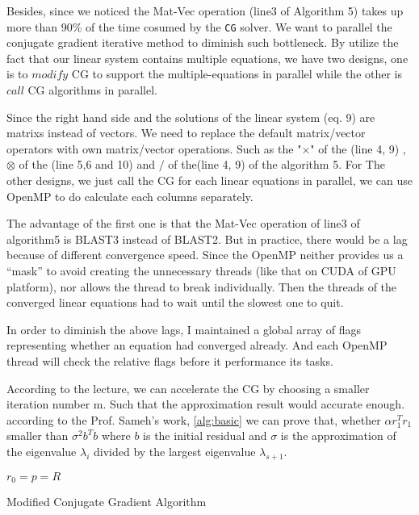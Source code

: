 Besides, since we noticed the Mat-Vec operation (line3 of Algorithm 5) takes up more than 90\% of the time cosumed by the {\tt CG} solver. We want to parallel the conjugate gradient iterative method to diminish such bottleneck.
By utilize the fact that our linear system contains multiple equations, we have two designs, one is to $modify$ CG to support the multiple-equations in parallel while the other is $call$ CG algorithms in parallel.

Since the right hand side and the solutions of the linear system (eq. 9) are matrixs instead of vectors. We need to replace the default matrix/vector operators with own matrix/vector operations. Such as the "$\times$" of the (line 4, 9) ,$\otimes$ of the (line 5,6 and 10) and $/$ of the(line 4, 9) of the algorithm 5. For The other designs, we just call the CG for each linear equations in parallel, we can use OpenMP to do calculate each columns separately.

The advantage of the first one is that the Mat-Vec operation of line3 of algorithm5 is BLAST3 instead of BLAST2. But in practice, there would be a lag because of different convergence speed. Since the OpenMP neither provides us a “mask” to avoid creating the unnecessary threads (like that on CUDA of GPU platform), nor allows the thread to break individually. Then the threads of the converged linear equations had to wait until the slowest one to quit. 
 
In order to diminish the above lags, I maintained a global array of flags representing whether an equation had converged already. And each OpenMP thread will check the relative flags before it performance its tasks.

According to the lecture, we can accelerate the CG by choosing a smaller iteration number m. Such that the approximation result would accurate enough. according to the Prof. Sameh's work, \ref{alg:basic} we can prove that, whether $\alpha r_1^Tr_1$ smaller than $\sigma^2b^Tb$ where $b$ is the initial residual and $\sigma$ is the approximation of the eigenvalue $\lambda_i$ divided by the largest eigenvalue $\lambda_{s+1} $.  
\begin{algorithm}[h]
	\SetArgSty{}
	{$r_0 = p = R$\;}
	\caption{Modified Conjugate Gradient Algorithm}
	\label{alg:modifiedcg}
\end{algorithm}


